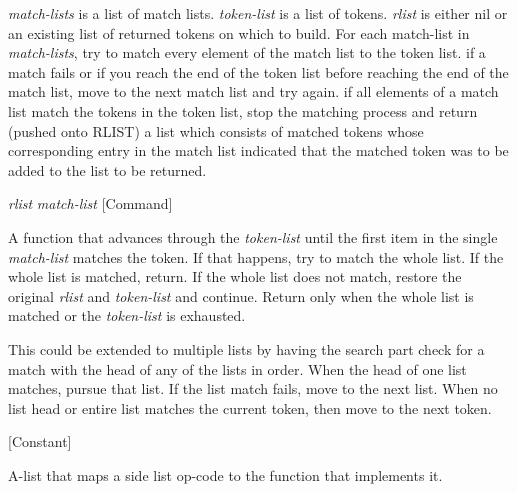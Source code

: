 \begin{doc-string}
\emph{match-lists} is a list of match lists.  \emph{token-list} is a list of tokens.  \emph{rlist}
is either nil or an existing list of returned tokens on which to build.  For
each match-list in \emph{match-lists}, try to match every element of the match list to
the token list.  if a match fails or if you reach the end of the token list
before reaching the end of the match list, move to the next match list and try
again.  if all elements of a match list match the tokens in the token list, stop
the matching process and return (pushed onto RLIST) a list which consists of
matched tokens whose corresponding entry in the match list indicated that the
matched token was to be added to the list to be returned.
\end{doc-string}

\vspace{1em}
\noindent
{}
\usebox{\funcname}\emph{rlist} \emph{match-list}
 \hfill [Command]
\hspace*{\wd\funcname}

\begin{doc-string}
A function that advances through the \emph{token-list} until the first item in the
single \emph{match-list} matches the token.  If that happens, try to match the whole
list.  If the whole list is matched, return.  If the whole list does not match,
restore the original \emph{rlist} and \emph{token-list} and continue.  Return only when the
whole list is matched or the \emph{token-list} is exhausted.

This could be extended to multiple lists by having the search part check for a
match with the head of any of the lists in order.  When the head of one list
matches, pursue that list.  If the list match fails, move to the next list.
When no list head or entire list matches the current token, then move to the
next token.
\end{doc-string}

\vspace{1em}
\noindent
{}
\usebox{\funcname}
 \hfill [Constant]

\begin{doc-string}
A-list that maps a side list op-code to the function that implements it.
\end{doc-string}

